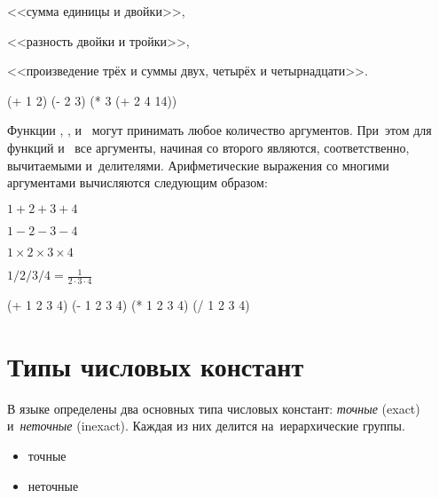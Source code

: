 \begin{example}{%
<<сумма единицы и двойки>>,

<<разность двойки и тройки>>,

<<произведение трёх и суммы двух, четырёх и четырнадцати>>.}
\begin{ExampleCode}
(+ 1 2)
(- 2 3)
(* 3 (+ 2 4 14))
\end{ExampleCode}
\end{example}

Функции \s{+}, \s{*}, \s{-} и~\s{/} могут принимать любое количество аргументов. При~этом для функций \s{-} и~\s{/} все аргументы, начиная со второго являются, соответственно, вычитаемыми и~делителями. Арифметические выражения со многими аргументами вычисляются следующим образом:

\begin{example}{%
$1+2+3+4$

$1-2-3-4$

$1\times2\times3\times4$

$1/2/3/4 = \frac{1}{2\cdot3\cdot4}$}
\begin{ExampleCode}
(+ 1 2 3 4)
(- 1 2 3 4)
(* 1 2 3 4)
(/ 1 2 3 4)
\end{ExampleCode}
\end{example}


\section{Типы числовых констант}%
В языке \Scheme определены два основных типа числовых констант: \emph{точные} (exact) и~\emph{неточные} (inexact). Каждая из них делится на~иерархические группы.

\begin{itemize}[--]
  \item точные
  \item неточные
\end{itemize}

